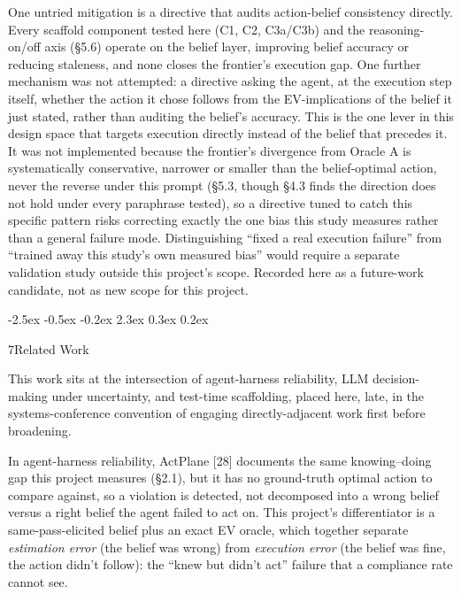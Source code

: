 \documentclass[
  11pt,
]{article}
\makeatletter
\newcounter{none} %
\renewcommand{\section}{%
  \@startsection{section}{1}{\z@}%
                {-2.5ex \@plus -0.5ex \@minus -0.2ex}%
                { 2.3ex \@plus  0.3ex \@minus  0.2ex}%
                {\large\bf\raggedright}%
}
\makeatother
\begin{document}
\begin{itemize}
  One untried mitigation is a directive that audits action-belief consistency directly. Every scaffold component tested here (C1, C2, C3a/C3b) and the reasoning-on/off axis (§5.6) operate on the belief layer, improving belief accuracy or reducing staleness, and none closes the frontier's execution gap. One further mechanism was not attempted: a directive asking the agent, at the execution step itself, whether the action it chose follows from the EV-implications of the belief it just stated, rather than auditing the belief's accuracy. This is the one lever in this design space that targets execution directly instead of the belief that precedes it. It was not implemented because the frontier's divergence from Oracle A is systematically conservative, narrower or smaller than the belief-optimal action, never the reverse under this prompt (§5.3, though §4.3 finds the direction does not hold under every paraphrase tested), so a directive tuned to catch this specific pattern risks correcting exactly the one bias this study measures rather than a general failure mode. Distinguishing ``fixed a real execution failure'' from ``trained away this study's own measured bias'' would require a separate validation study outside this project's scope. Recorded here as a future-work candidate, not as new scope for this project.
\end{itemize}

\section{7\quad Related Work}\label{related-work}

This work sits at the intersection of agent-harness reliability, LLM decision-making under uncertainty, and test-time scaffolding, placed here, late, in the systems-conference convention of engaging directly-adjacent work first before broadening.

In agent-harness reliability, ActPlane {[}28{]} documents the same knowing--doing gap this project measures (§2.1), but it has no ground-truth optimal action to compare against, so a violation is detected, not decomposed into a wrong belief versus a right belief the agent failed to act on. This project's differentiator is a same-pass-elicited belief plus an exact EV oracle, which together separate \emph{estimation error} (the belief was wrong) from \emph{execution error} (the belief was fine, the action didn't follow): the ``knew but didn't act'' failure that a compliance rate cannot see.
\end{document}
